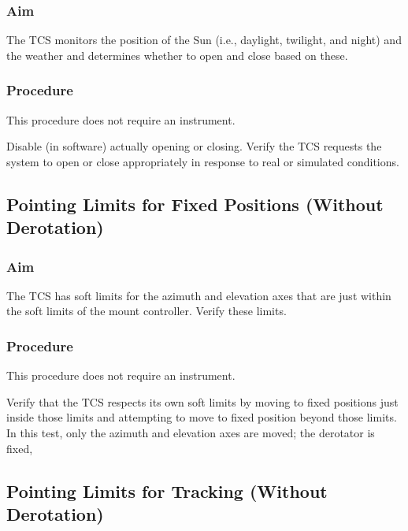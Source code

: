 \documentclass{article}
\begin{document}
\subsubsection{Aim}

The TCS monitors the position of the Sun (i.e., daylight, twilight, and night) and the weather and determines whether to open and close based on these.

\subsubsection{Procedure}

This procedure does not require an instrument.

Disable (in software) actually opening or closing. Verify the TCS requests the system to open or close appropriately in response to real or simulated conditions.


\subsection{Pointing Limits for Fixed Positions (Without Derotation)}

\subsubsection{Aim}

The TCS has soft limits for the azimuth and elevation axes that are just within the soft limits of the mount controller. Verify these limits.

\subsubsection{Procedure}

This procedure does not require an instrument.

 Verify that the TCS respects its own soft limits by moving to fixed positions just inside those limits and attempting to move to fixed position beyond those limits. In this test, only the azimuth and elevation axes are moved; the derotator is fixed,
 

\subsection{Pointing Limits for Tracking (Without Derotation)}
\end{document}
